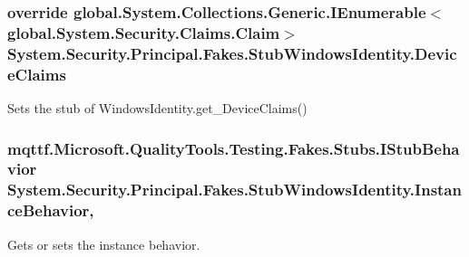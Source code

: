 \hypertarget{class_system_1_1_security_1_1_principal_1_1_fakes_1_1_stub_windows_identity_a5a2bd6aa24577be9fb5af9eb1d7d1a9a}{
\subsubsection[{Device\-Claims}]{\setlength{\rightskip}{0pt plus 5cm}override global.\-System.\-Collections.\-Generic.\-I\-Enumerable$<$global.\-System.\-Security.\-Claims.\-Claim$>$ System.\-Security.\-Principal.\-Fakes.\-Stub\-Windows\-Identity.\-Device\-Claims\hspace{0.3cm}{\ttfamily [get]}}}\label{class_system_1_1_security_1_1_principal_1_1_fakes_1_1_stub_windows_identity_a5a2bd6aa24577be9fb5af9eb1d7d1a9a}


Sets the stub of Windows\-Identity.\-get\-\_\-\-Device\-Claims()

\hypertarget{class_system_1_1_security_1_1_principal_1_1_fakes_1_1_stub_windows_identity_a7de19dacdcc4e32d6e246f8e57d36729}{
\subsubsection[{Instance\-Behavior}]{\setlength{\rightskip}{0pt plus 5cm}mqttf.\-Microsoft.\-Quality\-Tools.\-Testing.\-Fakes.\-Stubs.\-I\-Stub\-Behavior System.\-Security.\-Principal.\-Fakes.\-Stub\-Windows\-Identity.\-Instance\-Behavior\hspace{0.3cm}{\ttfamily [get]}, {\ttfamily [set]}}}\label{class_system_1_1_security_1_1_principal_1_1_fakes_1_1_stub_windows_identity_a7de19dacdcc4e32d6e246f8e57d36729}


Gets or sets the instance behavior.

